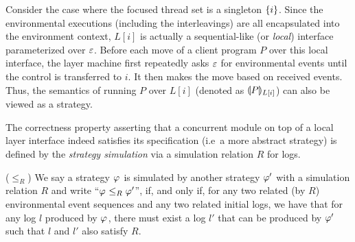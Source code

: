 Consider the case where the focused thread set is a singleton $\{i\}$.
Since the environmental executions (including the interleavings) are all encapsulated into the environment
context,  $L[i]$ is actually a sequential-like (or \emph{local}) interface parameterized over $\oracle$. 
Before each move of a client program $P$ over this local interface, 
the layer machine first repeatedly asks $\oracle$ for environmental events until the control is transferred to $i$. It then makes the move based on
received events. Thus, the semantics of running $P$ over $L[i]$ (denoted as $\llparenthesis P \rrparenthesis_{L[i]}$) can also be viewed
as a strategy.

The correctness property asserting that a concurrent module on top of a local layer interface indeed
satisfies its specification (i.e\, a more abstract strategy) is defined
by the \emph{strategy simulation} via a simulation relation $R$ for logs.

\begin{definition}($\le_R$) We say a strategy $\varphi_{}$ is simulated by
another strategy $\varphi_{}'$ with a simulation relation $R$ and write ``$\varphi_{} \le_R \varphi_{}'$'', if, and only if, for any two related (by $R$) environmental event sequences and any two related initial logs, we have that
for any log $l$ produced by $\varphi_{}$, there must exist a log $l'$ that can be produced by $\varphi_{}'$ such that $l$ and $l'$ also satisfy $R$.
\end{definition}

